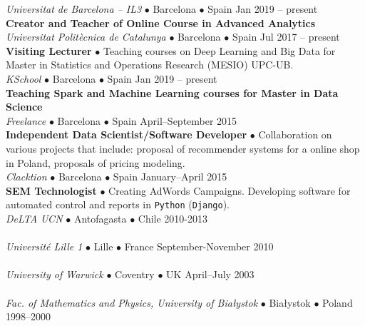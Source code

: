 \documentclass[a4paper, oneside]{scrreprt}
\begin{document}
\noindent{}\textit{Universitat de Barcelona -- IL3} $\bullet$ 
Barcelona $\bullet$ Spain \hfill Jan 2019 -- present\\
\noindent\textbf{\small Creator and Teacher of Online Course in Advanced Analytics} \\
\noindent{}\textit{Universitat Politècnica de Catalunya} $\bullet$ 
Barcelona $\bullet$ Spain \hfill Jul 2017 -- present\\
\noindent\textbf{\small Visiting Lecturer} $\bullet$ Teaching courses on Deep Learning and Big Data
for Master in Statistics and Operations Research (MESIO) UPC-UB.\\
\noindent{}\textit{KSchool} $\bullet$ 
Barcelona $\bullet$ Spain \hfill Jan 2019 -- present\\
\noindent\textbf{\small Teaching Spark and Machine Learning courses for Master in Data Science} \\
\noindent{}\textit{Freelance} $\bullet$ 
Barcelona $\bullet$ Spain \hfill April--September 2015\\
\noindent\textbf{\small Independent Data Scientist/Software Developer} $\bullet$ Collaboration on various projects that include: proposal of recommender systems for a
online shop in Poland, proposals of pricing modeling. \\
\noindent{}\textit{Clacktion} $\bullet$ 
Barcelona $\bullet$ Spain \hfill January--April 2015\\
\noindent\textbf{\small SEM Technologist} $\bullet$ Creating AdWords Campaigns.
Developing software for automated control and reports in \texttt{Python} (\texttt{Django}).\\ 
\noindent{}\textit{DeLTA UCN} $\bullet$ 
Antofagasta $\bullet$ Chile \hfill 2010-2013\\
\\
\noindent{}\textit{Universit{\'e} Lille 1} $\bullet$ Lille $\bullet$ France \hfill September-November 2010\\
\\
\noindent{}\textit{University of Warwick} 
$\bullet$ Coventry $\bullet$ UK \hfill April–July 2003\\
\\
\noindent{}\textit{Fac. of Mathematics and Physics, University
  of Bia{\l}ystok} $\bullet$  Bia{\l}ystok $\bullet$ Poland \hfill 1998--2000\\ 
\end{document}
